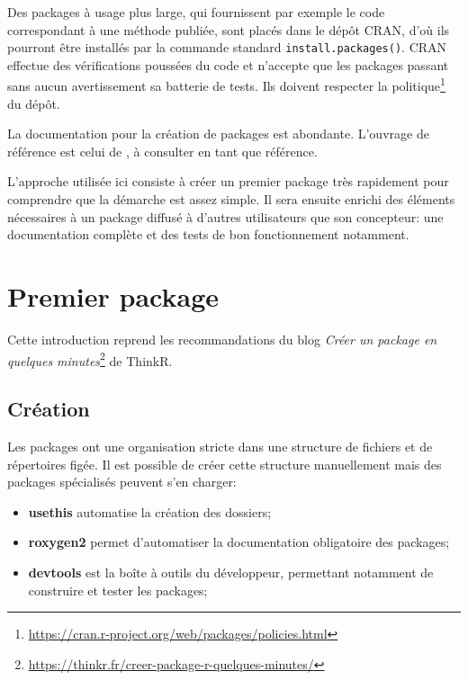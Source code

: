 \documentclass[
  12pt,
  french,
  a4paper,
  extrafontsizes,onecolumn,openright
  ]{memoir}
\providecommand{\tightlist}{%
  \setlength{\itemsep}{0pt}\setlength{\parskip}{0pt}}
\begin{document}
Des packages à usage plus large, qui fournissent par exemple le code correspondant à une méthode publiée, sont placés dans le dépôt CRAN, d'où ils pourront être installés par la commande standard \texttt{install.packages()}.
CRAN effectue des vérifications poussées du code et n'accepte que les packages passant sans aucun avertissement sa batterie de tests.
Ils doivent respecter la politique\footnote{\url{https://cran.r-project.org/web/packages/policies.html}} du dépôt.

La documentation pour la création de packages est abondante.
L'ouvrage de référence est celui de \textcite{Wickham2015}, à consulter en tant que référence.

L'approche utilisée ici consiste à créer un premier package très rapidement pour comprendre que la démarche est assez simple.
Il sera ensuite enrichi des éléments nécessaires à un package diffusé à d'autres utilisateurs que son concepteur: une documentation complète et des tests de bon fonctionnement notamment.

\hypertarget{premier-package}{%
\section{Premier package}\label{premier-package}}

Cette introduction reprend les recommandations du blog \emph{Créer un package en quelques minutes}\footnote{\url{https://thinkr.fr/creer-package-r-quelques-minutes/}} de ThinkR.

\hypertarget{cruxe9ation}{%
\subsection{Création}\label{cruxe9ation}}

Les packages ont une organisation stricte dans une structure de fichiers et de répertoires figée.
Il est possible de créer cette structure manuellement mais des packages spécialisés peuvent s'en charger:

\begin{itemize}
\tightlist
\item
  \textbf{usethis} automatise la création des dossiers;
\item
  \textbf{roxygen2} permet d'automatiser la documentation obligatoire des packages;
\item
  \textbf{devtools} est la boîte à outils du développeur, permettant notamment de construire et tester les packages;
\end{itemize}
\end{document}
